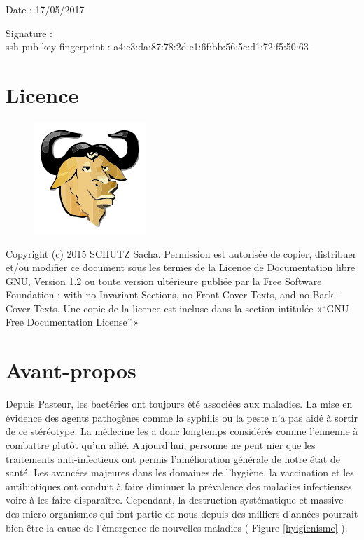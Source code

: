 \documentclass[12pt,a4paper]{article}
\begin{document}
Date : 17/05/2017

\vspace{0.5cm}

Signature : \\

ssh pub key fingerprint : a4:e3:da:87:78:2d:e1:6f:bb:56:5c:d1:72:f5:50:63
\vfill 

\section*{Licence}

\begin{figure}
\includegraphics[scale=0.5]{img/gfdl.png}\hfill
\end{figure}

Copyright (c) 2015 SCHUTZ Sacha. Permission est autorisée de copier,
distribuer et/ou modifier ce document sous les termes de la Licence de
Documentation libre GNU, Version 1.2 ou toute version ultérieure publiée
par la Free Software Foundation ; with no Invariant Sections, no
Front-Cover Texts, and no Back-Cover Texts. Une copie de la licence est
incluse dans la section intitulée «``GNU Free Documentation License''.»

\thispagestyle{empty} 
\setcounter{page}{0}
\thispagestyle{empty} 

\newpage

\tableofcontents
\newpage


\section{Avant-propos}

Depuis Pasteur, les bactéries ont toujours été associées aux maladies. La mise en évidence des agents pathogènes comme la syphilis ou la peste n'a pas aidé à sortir de ce stéréotype. La médecine les a donc longtemps considérés comme l'ennemie à combattre plutôt qu'un allié. 
Aujourd'hui, personne ne peut nier que les traitements anti-infectieux ont permis l'amélioration générale de notre état de santé. 
Les avancées majeures dans les domaines de l'hygiène, la vaccination et les antibiotiques ont conduit à faire diminuer la prévalence des maladies infectieuses voire à les faire disparaître. Cependant, la destruction systématique et massive des micro-organismes qui font partie de nous depuis des milliers d'années pourrait bien être la cause de l'émergence de nouvelles maladies ( Figure \ref{hyigienisme} ).
\end{document}
